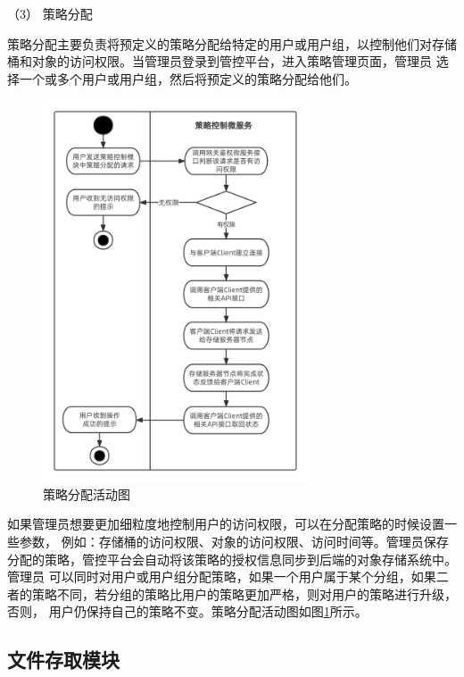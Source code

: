 （3） 策略分配




策略分配主要负责将预定义的策略分配给特定的用户或用户组，以控制他们对存储桶和对象的访问权限。当管理员登录到管控平台，进入策略管理页面，管理员
选择一个或多个用户或用户组，然后将预定义的策略分配给他们。

\begin{figure}[h]
    \centering
    \includegraphics[width=0.7\textwidth]{my_figures/chapter4/策略分配活动图.png}
    \caption{策略分配活动图}
    \label{fig:策略分配活动图}
\end{figure}

如果管理员想要更加细粒度地控制用户的访问权限，可以在分配策略的时候设置一些参数，
例如：存储桶的访问权限、对象的访问权限、访问时间等。管理员保存分配的策略，管控平台会自动将该策略的授权信息同步到后端的对象存储系统中。管理员
可以同时对用户或用户组分配策略，如果一个用户属于某个分组，如果二者的策略不同，若分组的策略比用户的策略更加严格，则对用户的策略进行升级，否则，
用户仍保持自己的策略不变。策略分配活动图如图\ref{fig:策略分配活动图}所示。



\subsection{文件存取模块}


